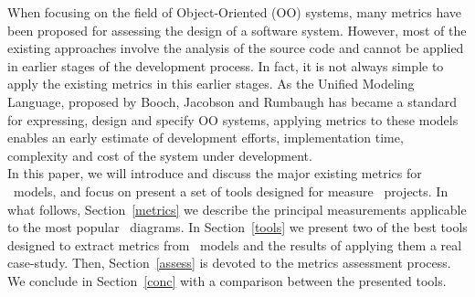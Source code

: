 When focusing on the field of Object-Oriented (OO) systems, many metrics have been proposed for assessing the design of a software system.
However, most of the existing approaches involve the analysis of the source code and cannot be applied in earlier stages of the development process.
In fact, it is not always simple to apply the existing metrics in this earlier stages. 
As the \textsf{Unified Modeling Language}, proposed by Booch, Jacobson and Rumbaugh\cite{USDPuml} has became a standard for expressing, design and specify OO systems, applying metrics to these models enables an early estimate of development efforts, implementation time, complexity and cost of the system under development. \\

In this paper, we will introduce and discuss the major existing metrics for \umlS~models, and focus on present a set of tools designed for measure \umlS~projects.
In what follows, Section~\ref{metrics} we describe the principal measurements applicable to the most popular \umlS~diagrams.
In Section~\ref{tools} we present two of the best tools designed to extract metrics from \umlS~models and the results of applying them a real case-study.
Then, Section~\ref{assess} is devoted to the metrics assessment process.
We conclude in Section~\ref{conc} with a comparison between the presented tools.

